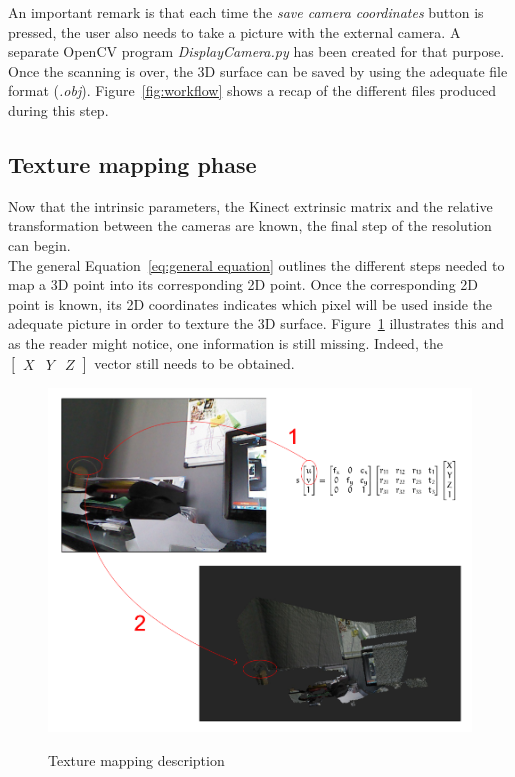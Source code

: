 An important remark is that each time the \textit{save camera coordinates} button is pressed, the user also needs to take a picture with the external camera. A separate OpenCV program \textit{DisplayCamera.py} has been created for that purpose.\\

Once the scanning is over, the 3D surface can be saved by using the adequate file format (\textit{.obj}). Figure~\ref{fig:workflow} shows a recap of the different files produced during this step.

\subsection{Texture mapping phase} 
\label{sec:Texture mapping phase}
Now that the intrinsic parameters, the Kinect extrinsic matrix and the relative transformation between the cameras are known, the final step of the resolution can begin.\\

The general Equation~\ref{eq:general equation} outlines the different steps needed to map a 3D point into its corresponding 2D point. Once the corresponding 2D point is known, its 2D coordinates indicates which pixel will be used inside the adequate picture in order to texture the 3D surface. Figure~\ref{fig:Texture mapping description} illustrates this and as the reader might notice, one information is still missing. Indeed, the $\left[ \begin{smallmatrix} X & Y & Z \end{smallmatrix} \right]$ vector still needs to be obtained.\\

\begin{figure}
\caption{Texture mapping description}
\centering
    \includegraphics[width=1.0\textwidth]{images/mappingDescription.png}
\label{fig:Texture mapping description}
\end{figure}

